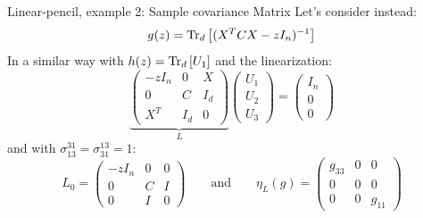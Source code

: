 \documentclass[10pt]{beamer}
\begin{document}
\begin{frame}{Linear-pencil, example 2: Sample covariance Matrix}
  Let's consider instead:
  $$ g(z) = \traceLim[d]{(X^T C X - zI_n)^{-1}}$$
  In a similar way with $h(z) = \traceLim[d]{U_1}$ and the linearization:
  \begin{equation*}
    \underbrace{ \begin{pmatrix}
      -zI_n & 0 & X\\
      0 & C & I_d \\
      X^T & I_d & 0
    \end{pmatrix}}_{L}
    \begin{pmatrix}
      U_1 \\
      U_2 \\
      U_3
    \end{pmatrix}
    = \begin{pmatrix}
      I_n\\
      0\\
      0
    \end{pmatrix}
  \end{equation*}
  and with $\sigma_{13}^{31} = \sigma_{31}^{13} = 1$:
  \begin{equation*}
    L_0 = \begin{pmatrix}
      -zI_n & 0 & 0\\
      0 & C & I\\
      0 & I & 0
    \end{pmatrix}
    \qquad
    \text{and}
    \qquad
    \eta_L(g) = \begin{pmatrix}
      g_{33} & 0 & 0\\
      0 & 0 & 0\\
      0 & 0 & g_{11}
    \end{pmatrix}
  \end{equation*}
\end{frame}
\end{document}

